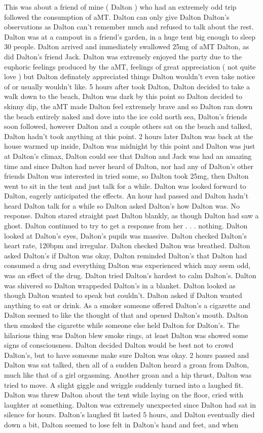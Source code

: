 \documentclass[12pt]{book}
\begin{document}
This was about a friend of mine ( Dalton ) who had an extremely odd trip followed the consumption of aMT. Dalton can only give Dalton Dalton's observations as Dalton can't remember much and refused to talk about the rest. Dalton was at a campout in a friend's garden, in a huge tent big enough to sleep 30 people. Dalton arrived and immediately swallowed 25mg of aMT Dalton, as did Dalton's friend Jack. Dalton was extremely enjoyed the party due to the euphoric feelings produced by the aMT, feelings of great appreciation ( not quite love ) but Dalton definately appreciated things Dalton wouldn't even take notice of or usually wouldn't like. 5 hours after took Dalton, Dalton decided to take a walk down to the beach, Dalton was dark by this point so Dalton decided to skinny dip, the aMT made Dalton feel extremely brave and so Dalton ran down the beach entirely naked and dove into the ice cold north sea, Dalton's friends soon followed, however Dalton and a couple others sat on the beach and talked, Dalton hadn't took anything at this point. 2 hours later Dalton was back at the house warmed up inside, Dalton was midnight by this point and Dalton was just at Dalton's climax, Dalton could see that Dalton and Jack was had an amazing time and since Dalton had never heard of Dalton, nor had any of Dalton's other friends Dalton was interested in tried some, so Dalton took 25mg, then Dalton went to sit in the tent and just talk for a while. Dalton was looked forward to Dalton, eagerly anticipated the effects. An hour had passed and Dalton hadn't heard Dalton talk for a while so Dalton asked Dalton's how Dalton was. No response. Dalton stared straight past Dalton blankly, as though Dalton had saw a ghost. Dalton continued to try to get a response from her . . .  nothing. Dalton looked at Dalton's eyes, Dalton's pupils was massive. Dalton checked Dalton's heart rate, 120bpm and irregular. Dalton checked Dalton was breathed. Dalton asked Dalton's if Dalton was okay, Dalton reminded Dalton's that Dalton had consumed a drug and everything Dalton was experienced which may seem odd, was an effect of the drug. Dalton tried Dalton's hardest to calm Dalton's. Dalton was shivered so Dalton wrappeded Dalton's in a blanket. Dalton looked as though Dalton wanted to speak but couldn't. Dalton asked if Dalton wanted anything to eat or drink. As a smoker someone offered Dalton's a cigarette and Dalton seemed to like the thought of that and opened Dalton's mouth. Dalton then smoked the cigarette while someone else held Dalton for Dalton's. The hilarious thing was Dalton blew smoke rings, at least Dalton was showed some signs of consciousness. Dalton decided Dalton would be best not to crowd Dalton's, but to have someone make sure Dalton was okay. 2 hours passed and Dalton was sat talked, then all of a sudden Dalton heard a groan from Dalton, much like that of a girl orgasming. Another groan and a hip thrust, Dalton was tried to move. A slight giggle and wriggle suddenly turned into a laughed fit. Dalton was threw Dalton about the tent while laying on the floor, cried with laughter at something. Dalton was extremely unexpected since Dalton had sat in silence for hours. Dalton's laughed fit lasted 5 hours, and Dalton eventually died down a bit, Dalton seemed to lose felt in Dalton's hand and feet, and when 
\end{document}
